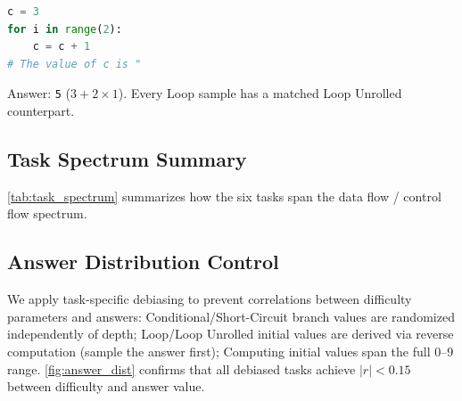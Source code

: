 \begin{lstlisting}[language=Python]
c = 3
for i in range(2):
    c = c + 1
# The value of c is "
\end{lstlisting}
\noindent Answer: \texttt{5} ($3 + 2 \times 1$). Every Loop sample has a matched Loop Unrolled counterpart.

\subsection{Task Spectrum Summary}
\label{app:subsec:task_spectrum}

\cref{tab:task_spectrum} summarizes how the six tasks span the data flow / control flow spectrum.

\begin{table}[H]
\centering
{}
\caption{Task families along the data flow / control flow spectrum.}
\label{tab:task_spectrum}
\end{table}

\subsection{Answer Distribution Control}
\label{app:subsec:answer_dist}

We apply task-specific debiasing to prevent correlations between difficulty parameters and answers:
Conditional/Short-Circuit branch values are randomized independently of depth;
Loop/Loop Unrolled initial values are derived via reverse computation (sample the answer first);
Computing initial values span the full 0--9 range.
\cref{fig:answer_dist} confirms that all debiased tasks achieve $|r| < 0.15$ between difficulty and answer value.

